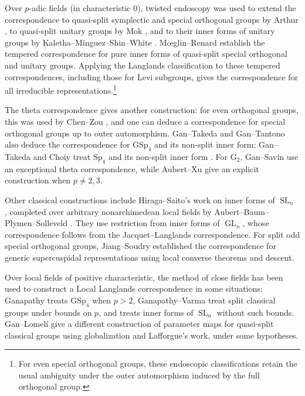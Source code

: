 \documentclass[reqno]{amsart}
\numberwithin{equation}{subsection}
\DeclareMathOperator{\GL}{GL}
\DeclareMathOperator{\SL}{SL}
\theoremstyle{remark}
\numberwithin{equation}{subsection}
\numberwithin{figure}{subsection}
\begin{document}
Over $p$-adic fields (in characteristic 0), twisted endoscopy was used to extend the correspondence to quasi-split symplectic and special orthogonal groups by Arthur \cite{Art13}, to quasi-split unitary groups by Mok \cite{Mok15}, and to their inner forms of unitary groups by Kaletha--M\'{i}nguez--Shin--White \cite{KMSW14}. M\oe glin--Renard \cite[\S 3.6]{MoeRen18} establish the tempered correspondence for pure inner forms of quasi-split special orthogonal and unitary groups. Applying the Langlands classification to these tempered correspondences, including those for Levi subgroups, gives the correspondence for all irreducible representations.\footnote{For even special orthogonal groups, these endoscopic classifications retain the usual ambiguity under the outer automorphism induced by the full orthogonal group.} 

The theta correspondence gives another construction: for even orthogonal groups, this was used by Chen--Zou \cite{CZ21}, and one can deduce a correspondence for special orthogonal groups up to outer automorphism. Gan--Takeda and Gan--Tantono \cite{GT11,GT14} also deduce the correspondence for $\mathrm{GSp}_4$ and its non-split inner form; Gan--Takeda and Choiy treat $\mathrm{Sp}_4$ and its non-split inner form \cite{GT10,Cho17}. For $\mathrm{G}_2$, Gan--Savin \cite{GS23} use an exceptional theta correspondence, while Aubert--Xu \cite[Theorem 10.2.1]{AX22} give an explicit construction when $p\ne 2,3$.

Other classical constructions include Hiraga--Saito's work on inner forms of $\SL_n$ \cite{HiSa12}, completed over arbitrary nonarchimedean local fields by Aubert--Baum--Plymen--Solleveld \cite{ABPS16}. They use restriction from inner forms of $\GL_n$, whose correspondence follows from the Jacquet--Langlands correspondence. For split odd special orthogonal groups, Jiang--Soudry \cite{JS03} established the correspondence for generic supercuspidal representations using local converse theorems and descent.

Over local fields of positive characteristic, the method of close fields has been used to construct a Local Langlands correspondence in some situations: Ganapathy \cite{Gan15} treats $\mathrm{GSp}_4$ when $p>2$, Ganapathy--Varma \cite{GV17} treat split classical groups under bounds on $p$, and \cite{ABPS16} treats inner forms of $\SL_n$ without such bounds. Gan--Lomel\'{i} \cite[\S 7]{GanLom18} give a different construction of parameter maps for quasi-split classical groups using globalization and Lafforgue's work, under some hypotheses. 
\end{document}
